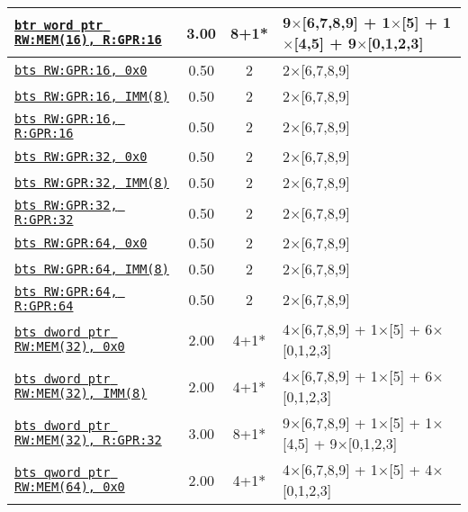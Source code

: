 \documentclass[a4paper,english,fontsize=9]{scrartcl}
\begin{document}
\begin{longtable}{p{}ccL{.25\textwidth}}
  \midrule
  \texttt{\href{https://felixcloutier.com/x86/BTR.html}{btr word ptr RW:MEM(16), R:GPR:16}} & 3.00 & 8+1* & 9\(\times\)[6,7,8,9] + 1\(\times\)[5] + 1\(\times\)[4,5] + 9\(\times\)[0,1,2,3] \\
  \midrule
  \texttt{\href{https://felixcloutier.com/x86/BTS.html}{bts RW:GPR:16, 0x0}} & 0.50 & 2 & 2\(\times\)[6,7,8,9] \\
  \midrule
  \texttt{\href{https://felixcloutier.com/x86/BTS.html}{bts RW:GPR:16, IMM(8)}} & 0.50 & 2 & 2\(\times\)[6,7,8,9] \\
  \midrule
  \texttt{\href{https://felixcloutier.com/x86/BTS.html}{bts RW:GPR:16, R:GPR:16}} & 0.50 & 2 & 2\(\times\)[6,7,8,9] \\
  \midrule
  \texttt{\href{https://felixcloutier.com/x86/BTS.html}{bts RW:GPR:32, 0x0}} & 0.50 & 2 & 2\(\times\)[6,7,8,9] \\
  \midrule
  \texttt{\href{https://felixcloutier.com/x86/BTS.html}{bts RW:GPR:32, IMM(8)}} & 0.50 & 2 & 2\(\times\)[6,7,8,9] \\
  \midrule
  \texttt{\href{https://felixcloutier.com/x86/BTS.html}{bts RW:GPR:32, R:GPR:32}} & 0.50 & 2 & 2\(\times\)[6,7,8,9] \\
  \midrule
  \texttt{\href{https://felixcloutier.com/x86/BTS.html}{bts RW:GPR:64, 0x0}} & 0.50 & 2 & 2\(\times\)[6,7,8,9] \\
  \midrule
  \texttt{\href{https://felixcloutier.com/x86/BTS.html}{bts RW:GPR:64, IMM(8)}} & 0.50 & 2 & 2\(\times\)[6,7,8,9] \\
  \midrule
  \texttt{\href{https://felixcloutier.com/x86/BTS.html}{bts RW:GPR:64, R:GPR:64}} & 0.50 & 2 & 2\(\times\)[6,7,8,9] \\
  \midrule
  \texttt{\href{https://felixcloutier.com/x86/BTS.html}{bts dword ptr RW:MEM(32), 0x0}} & 2.00 & 4+1* & 4\(\times\)[6,7,8,9] + 1\(\times\)[5] + 6\(\times\)[0,1,2,3] \\
  \midrule
  \texttt{\href{https://felixcloutier.com/x86/BTS.html}{bts dword ptr RW:MEM(32), IMM(8)}} & 2.00 & 4+1* & 4\(\times\)[6,7,8,9] + 1\(\times\)[5] + 6\(\times\)[0,1,2,3] \\
  \midrule
  \texttt{\href{https://felixcloutier.com/x86/BTS.html}{bts dword ptr RW:MEM(32), R:GPR:32}} & 3.00 & 8+1* & 9\(\times\)[6,7,8,9] + 1\(\times\)[5] + 1\(\times\)[4,5] + 9\(\times\)[0,1,2,3] \\
  \midrule
  \texttt{\href{https://felixcloutier.com/x86/BTS.html}{bts qword ptr RW:MEM(64), 0x0}} & 2.00 & 4+1* & 4\(\times\)[6,7,8,9] + 1\(\times\)[5] + 4\(\times\)[0,1,2,3] \\

\end{longtable}
\end{document}

